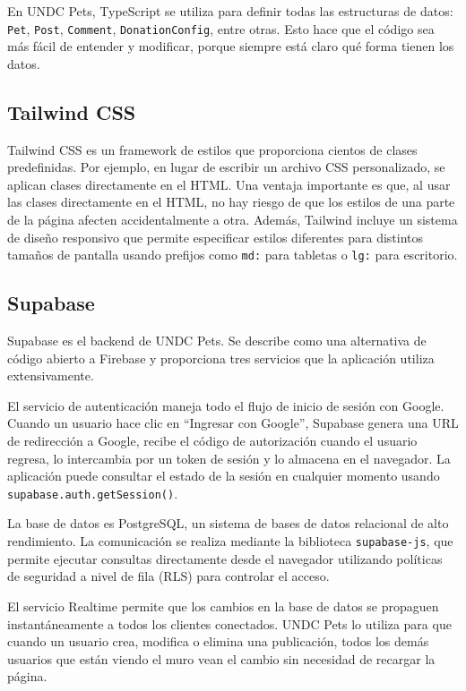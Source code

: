 \documentclass[12pt,a4paper]{article}
\begin{document}
En UNDC Pets, TypeScript se utiliza para definir todas las estructuras de datos: \texttt{Pet}, \texttt{Post}, \texttt{Comment}, \texttt{DonationConfig}, entre otras. Esto hace que el código sea más fácil de entender y modificar, porque siempre está claro qué forma tienen los datos.

\subsection{Tailwind CSS}

Tailwind CSS es un framework de estilos que proporciona cientos de clases predefinidas. Por ejemplo, en lugar de escribir un archivo CSS personalizado, se aplican clases directamente en el HTML. Una ventaja importante es que, al usar las clases directamente en el HTML, no hay riesgo de que los estilos de una parte de la página afecten accidentalmente a otra. Además, Tailwind incluye un sistema de diseño responsivo que permite especificar estilos diferentes para distintos tamaños de pantalla usando prefijos como \texttt{md:} para tabletas o \texttt{lg:} para escritorio.

\subsection{Supabase}

Supabase es el backend de UNDC Pets. Se describe como una alternativa de código abierto a Firebase y proporciona tres servicios que la aplicación utiliza extensivamente.

El servicio de autenticación maneja todo el flujo de inicio de sesión con Google. Cuando un usuario hace clic en ``Ingresar con Google'', Supabase genera una URL de redirección a Google, recibe el código de autorización cuando el usuario regresa, lo intercambia por un token de sesión y lo almacena en el navegador. La aplicación puede consultar el estado de la sesión en cualquier momento usando \texttt{supabase.auth.getSession()}.

La base de datos es PostgreSQL, un sistema de bases de datos relacional de alto rendimiento. La comunicación se realiza mediante la biblioteca \texttt{supabase-js}, que permite ejecutar consultas directamente desde el navegador utilizando políticas de seguridad a nivel de fila (RLS) para controlar el acceso.

El servicio Realtime permite que los cambios en la base de datos se propaguen instantáneamente a todos los clientes conectados. UNDC Pets lo utiliza para que cuando un usuario crea, modifica o elimina una publicación, todos los demás usuarios que están viendo el muro vean el cambio sin necesidad de recargar la página.
\end{document}
